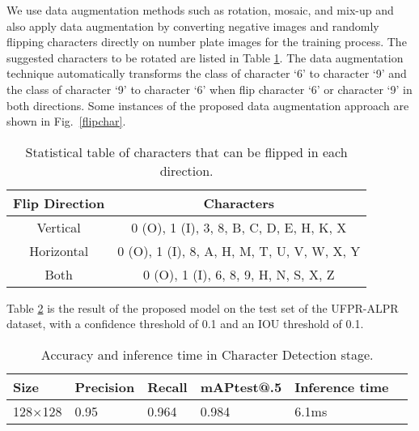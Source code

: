 \documentclass[conference]{IEEEtran}
\begin{document}
We use data augmentation methods such as rotation, mosaic, and mix-up and also apply data augmentation by converting negative images and randomly flipping characters directly on number plate images for the training process. The suggested characters to be rotated are listed in Table \ref{table3}. The data augmentation technique automatically transforms the class of character `6' to character `9' and the class of character `9' to character `6' when flip character `6' or character `9' in both directions. Some instances of the proposed data augmentation approach are shown in Fig.~\ref{flipchar}.
\begin{table}[h!]
  \begin{center}
    \centering
    \caption{Statistical table of characters that can be flipped in each direction.}
\begin{tabular}{|c | c |}
    \hline
      \textbf{Flip Direction} & \textbf{Characters} \\
      \hline
      Vertical & 0 (O), 1 (I), 3, 8, B, C, D, E, H, K, X   \\
      Horizontal &  0 (O), 1 (I), 8, A, H, M, T, U, V, W, X, Y  \\
      Both &  0 (O), 1 (I), 6, 8, 9, H, N, S, X, Z   \\
     \hline
    \end{tabular}
    \label{table3}
  \end{center}
\end{table}

Table \ref{table4} is the result of the proposed model on the test set of the UFPR-ALPR dataset, with a confidence threshold of 0.1 and an IOU threshold of 0.1.

\begin{table}[h!]
  \begin{center}
    \centering
    \caption{Accuracy and inference time in Character Detection stage.}
    \begin{tabular}{|p{11mm} | p{11mm} | p{8mm} | p{12mm} | p{12mm}| p{11mm}|}
    \hline
      \textbf{Size}  & \textbf{Precision} & \textbf{Recall}& \textbf{mAP\newline test@.5}& \textbf{Inference time}\\
      \hline
        128$\times$128  & 0.95 & 0.964 & 0.984 & 6.1ms\\
      \hline
    \end{tabular}
    \label{table4}
  \end{center}
\end{table}
\end{document}
